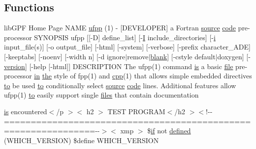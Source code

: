 \subsection*{Functions}
\begin{DoxyCompactItemize}
\item 
lib\+G\+PF Home Page N\+A\+ME \hyperlink{ufpp__overview_81_8txt_a97c20a96bcab81bc74c9d64b001f1202}{ufpp} (1) -\/ \mbox{[}D\+E\+V\+E\+L\+O\+P\+ER\mbox{]} a Fortran \hyperlink{ufpp__overview_81_8txt_a4d6669ece605d05985c83a04dd38e0ad}{source} \hyperlink{ufpp__overview_81_8txt_a74a0615f2d9c4a398d9126096f8092f8}{code} pre-\/processor S\+Y\+N\+O\+P\+S\+IS ufpp \mbox{[}\mbox{[}-\/D\mbox{]} define\+\_\+list\mbox{]} \mbox{[}-\/\hyperlink{continue_87_8txt_ae7b8826453d28f1bdb2fba7e889eb23b}{I} include\+\_\+directories\mbox{]} \mbox{[}-\/\hyperlink{intro__blas1_83_8txt_a8ba82a50c0c2c12d5f6a77f7e4651c0b}{i} input\+\_\+file(s)\mbox{]} \mbox{[}-\/o output\+\_\+file\mbox{]} \mbox{[}-\/html\mbox{]} \mbox{[}-\/system\mbox{]} \mbox{[}-\/verbose\mbox{]} \mbox{[}-\/prefix character\+\_\+\+A\+DE\mbox{]} \mbox{[}-\/keeptabs\mbox{]} \mbox{[}-\/noenv\mbox{]} \mbox{[}-\/width n\mbox{]} \mbox{[}-\/d ignore$\vert$remove$\vert$\hyperlink{M__stopwatch_83_8txt_ab1e613d54e5499697dd1189104a9f678}{blank}\mbox{]} \mbox{[}-\/cstyle default$\vert$doxygen\mbox{]} \mbox{[}-\/\hyperlink{inquiry__stopwatch_83_8txt_aee378be19d20935dd436517beda00ee4}{version}\mbox{]} \mbox{[}-\/help \mbox{[}-\/html\mbox{]}\mbox{]} D\+E\+S\+C\+R\+I\+P\+T\+I\+ON The ufpp(1) command \hyperlink{intro__blas1_83_8txt_a42a91df93f840595de3019ceb5d1df23}{is} a basic \hyperlink{what__overview_81_8txt_a447b56c526e8da30e0dc94673727ee25}{file} pre-\/processor \hyperlink{M__journal_83_8txt_afce72651d1eed785a2132bee863b2f38}{in} \hyperlink{M__stopwatch_83_8txt_a0f266597de2e57eb3aa964927bb30e14}{the} style of fpp(1) and \hyperlink{ufpp__overview_81_8txt_ad80405d1dd53db5cd0aa7a8cc7e457a3}{cpp}(1) that allows simple embedded directives \hyperlink{M__stopwatch_83_8txt_a97209fd3e34ef701c0a9734280779cbb}{to} be used \hyperlink{M__stopwatch_83_8txt_a97209fd3e34ef701c0a9734280779cbb}{to} conditionally select \hyperlink{ufpp__overview_81_8txt_a4d6669ece605d05985c83a04dd38e0ad}{source} \hyperlink{ufpp__overview_81_8txt_a74a0615f2d9c4a398d9126096f8092f8}{code} lines. Additional features allow ufpp(1) \hyperlink{M__stopwatch_83_8txt_a97209fd3e34ef701c0a9734280779cbb}{to} easily support single \hyperlink{ufpp__overview_81_8txt_a5673f2294ff1627be40c90eae33141ca}{files} that contain documentation
\item 
\hyperlink{intro__blas1_83_8txt_a42a91df93f840595de3019ceb5d1df23}{is} encountered$<$/p $>$$<$ h2 $>$ T\+E\+ST P\+R\+O\+G\+R\+AM$<$/h2 $>$$<$!-\/-\/===============================================================-\/-\/$>$$<$ xmp $>$ \$\hyperlink{exit_87_8txt_a77395982f8d25581c808c40f3b634d90}{if} not \hyperlink{ufpp__overview_81_8txt_a199f35c6b903296e6ea1b146249c1ab3}{defined} (W\+H\+I\+C\+H\+\_\+\+V\+E\+R\+S\+I\+ON) \$define W\+H\+I\+C\+H\+\_\+\+V\+E\+R\+S\+I\+ON
$$
\end{DoxyCompactItemize}
